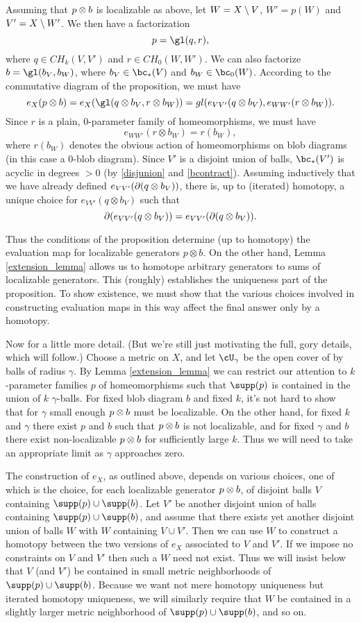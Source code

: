 Assuming that $p\otimes b$ is localizable as above, 
let $W = X \setminus V$, $W' = p(W)$ and $V' = X\setminus W'$.
We then have a factorization 
\[
	p = \gl(q, r),
\]
where $q \in CH_k(V, V')$ and $r \in CH_0(W, W')$.
We can also factorize $b = \gl(b_V, b_W)$, where $b_V\in \bc_*(V)$ and $b_W\in\bc_0(W)$.
According to the commutative diagram of the proposition, we must have
\[
	e_X(p\otimes b) = e_X(\gl(q\otimes b_V, r\otimes b_W)) = 
				gl(e_{VV'}(q\otimes b_V), e_{WW'}(r\otimes b_W)) .
\]
Since $r$ is a plain, 0-parameter family of homeomorphisms, we must have
\[
	e_{WW'}(r\otimes b_W) = r(b_W),
\]
where $r(b_W)$ denotes the obvious action of homeomorphisms on blob diagrams (in
this case a 0-blob diagram).
Since $V'$ is a disjoint union of balls, $\bc_*(V')$ is acyclic in degrees $>0$ 
(by \ref{disjunion} and \ref{bcontract}).
Assuming inductively that we have already defined $e_{VV'}(\partial(q\otimes b_V))$,
there is, up to (iterated) homotopy, a unique choice for $e_{VV'}(q\otimes b_V)$
such that 
\[
	\partial(e_{VV'}(q\otimes b_V)) = e_{VV'}(\partial(q\otimes b_V)) .
\]

Thus the conditions of the proposition determine (up to homotopy) the evaluation
map for localizable generators $p\otimes b$.
On the other hand, Lemma \ref{extension_lemma} allows us to homotope 
arbitrary generators to sums of localizable generators.
This (roughly) establishes the uniqueness part of the proposition.
To show existence, we must show that the various choices involved in constructing
evaluation maps in this way affect the final answer only by a homotopy.

Now for a little more detail.
(But we're still just motivating the full, gory details, which will follow.)
Choose a metric on $X$, and let $\cU_\gamma$ be the open cover of by balls of radius $\gamma$.
By Lemma \ref{extension_lemma} we can restrict our attention to $k$-parameter families 
$p$ of homeomorphisms such that $\supp(p)$ is contained in the union of $k$ $\gamma$-balls.
For fixed blob diagram $b$ and fixed $k$, it's not hard to show that for $\gamma$ small enough
$p\otimes b$ must be localizable.
On the other hand, for fixed $k$ and $\gamma$ there exist $p$ and $b$ such that $p\otimes b$ is not localizable,
and for fixed $\gamma$ and $b$ there exist non-localizable $p\otimes b$ for sufficiently large $k$.
Thus we will need to take an appropriate limit as $\gamma$ approaches zero.

The construction of $e_X$, as outlined above, depends on various choices, one of which 
is the choice, for each localizable generator $p\otimes b$, 
of disjoint balls $V$ containing $\supp(p)\cup\supp(b)$.
Let $V'$ be another disjoint union of balls containing $\supp(p)\cup\supp(b)$,
and assume that there exists yet another disjoint union of balls $W$ with $W$ containing 
$V\cup V'$.
Then we can use $W$ to construct a homotopy between the two versions of $e_X$ 
associated to $V$ and $V'$.
If we impose no constraints on $V$ and $V'$ then such a $W$ need not exist.
Thus we will insist below that $V$ (and $V'$) be contained in small metric neighborhoods
of $\supp(p)\cup\supp(b)$.
Because we want not mere homotopy uniqueness but iterated homotopy uniqueness,
we will similarly require that $W$ be contained in a slightly larger metric neighborhood of 
$\supp(p)\cup\supp(b)$, and so on.


